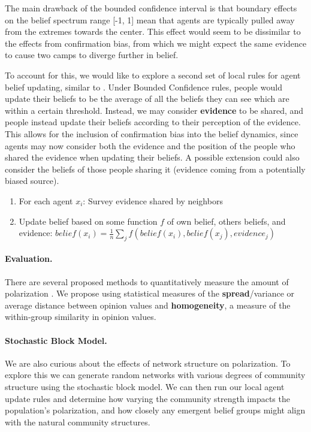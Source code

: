 \documentclass{article}
\begin{document}
The main drawback of the bounded confidence interval is that boundary effects on the belief spectrum range [-1, 1] mean that agents are typically pulled away from the extremes towards the center. This effect would seem to be dissimilar to the effects from confirmation bias, from which we might expect the same evidence to cause two camps to diverge further in belief. 

To account for this, we would like to explore a second set of local rules for agent belief updating, similar to \citet{confbias}. Under Bounded Confidence rules, people would update their beliefs to be the average of all the beliefs they can see which are within a certain threshold. Instead, we may consider \textbf{evidence} to be shared, and people instead update their beliefs according to their perception of the evidence. This allows for the inclusion of confirmation bias into the belief dynamics, since agents may now consider both the evidence and the position of the people who shared the evidence when updating their beliefs. A possible extension could also consider the beliefs of those people sharing it (evidence coming from a potentially biased source).
\begin{enumerate}
    \item For each agent $x_i$: Survey evidence shared by neighbors
    \item Update belief based on some function $f$ of own belief, others beliefs, and evidence: $belief(x_i) = \frac{1}{n} \sum_j f(belief(x_i), belief(x_j), evidence_j)$
\end{enumerate}

\paragraph{Evaluation.} There are several proposed methods to quantitatively measure the amount of polarization \citep{oconnor2017}. We propose using statistical measures of the \textbf{spread}/variance or average distance between opinion values and \textbf{homogeneity}, a measure of the within-group similarity in opinion values.

\paragraph{Stochastic Block Model.} We are also curious about the effects of network structure on polarization. To explore this we can generate random networks with various degrees of community structure using the stochastic block model. We can then run our local agent update rules and determine how varying the  community strength impacts the population's polarization, and how closely any emergent belief groups might align with the natural community structures.
\end{document}
